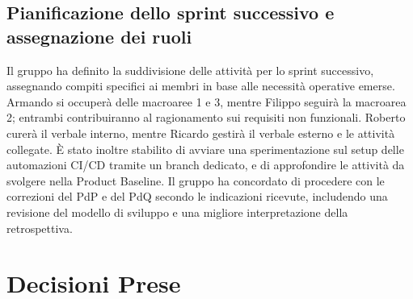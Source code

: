 \subsection{Pianificazione dello sprint successivo e assegnazione dei ruoli}
Il gruppo ha definito la suddivisione delle attività per lo sprint successivo, assegnando compiti specifici ai membri in base alle necessità operative emerse. Armando si occuperà delle macroaree 1 e 3, mentre Filippo seguirà la macroarea 2; entrambi contribuiranno al ragionamento sui requisiti non funzionali. Roberto curerà il verbale interno, mentre Ricardo gestirà il verbale esterno e le attività collegate. È stato inoltre stabilito di avviare una sperimentazione sul setup delle automazioni CI/CD tramite un branch dedicato, e di approfondire le attività da svolgere nella Product Baseline. Il gruppo ha concordato di procedere con le correzioni del PdP e del PdQ secondo le indicazioni ricevute, includendo una revisione del modello di sviluppo e una migliore interpretazione della retrospettiva.


\section{Decisioni Prese}

